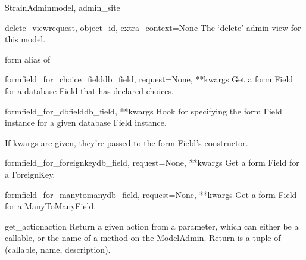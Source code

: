 \documentclass[letterpaper,10pt,english]{sphinxmanual}
\begin{document}
\begin{classdesc}{StrainAdmin}{model, admin\_site}
\hypertarget{animal.admin.StrainAdmin.delete_view}{}\begin{methoddesc}{delete\_view}{request, object\_id, extra\_context=None}
The `delete' admin view for this model.
\end{methoddesc}

\hypertarget{animal.admin.StrainAdmin.form}{}\begin{memberdesc}{form}
alias of 
\end{memberdesc}

\hypertarget{animal.admin.StrainAdmin.formfield_for_choice_field}{}\begin{methoddesc}{formfield\_for\_choice\_field}{db\_field, request=None, **kwargs}
Get a form Field for a database Field that has declared choices.
\end{methoddesc}

\hypertarget{animal.admin.StrainAdmin.formfield_for_dbfield}{}\begin{methoddesc}{formfield\_for\_dbfield}{db\_field, **kwargs}
Hook for specifying the form Field instance for a given database Field
instance.

If kwargs are given, they're passed to the form Field's constructor.
\end{methoddesc}

\hypertarget{animal.admin.StrainAdmin.formfield_for_foreignkey}{}\begin{methoddesc}{formfield\_for\_foreignkey}{db\_field, request=None, **kwargs}
Get a form Field for a ForeignKey.
\end{methoddesc}

\hypertarget{animal.admin.StrainAdmin.formfield_for_manytomany}{}\begin{methoddesc}{formfield\_for\_manytomany}{db\_field, request=None, **kwargs}
Get a form Field for a ManyToManyField.
\end{methoddesc}

\hypertarget{animal.admin.StrainAdmin.get_action}{}\begin{methoddesc}{get\_action}{action}
Return a given action from a parameter, which can either be a callable,
or the name of a method on the ModelAdmin.  Return is a tuple of
(callable, name, description).
\end{methoddesc}


\end{classdesc}
\end{document}
